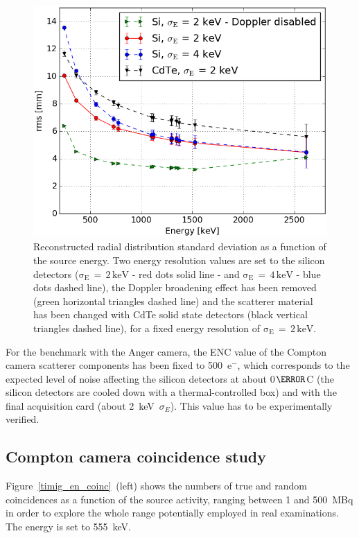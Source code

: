 \begin{figure}[h!]
\centering
\includegraphics[width=.5\linewidth]{03_GraphicFiles/chapter4/SPECT/compton/ENC/rmsVSenergy_ENCstudy_Doppler} 
\caption{Reconstructed radial distribution standard deviation as a function of the source energy. Two energy resolution values are set to the silicon detectors ($\mathrm{\sigma_{E}\,=\,2\,keV}$ - red dots solid line - and $\mathrm{\sigma_{E}\,=\,4\,keV}$ - blue dots dashed line), the Doppler broadening effect has been removed (green horizontal triangles dashed line) and the scatterer material has been changed with CdTe solid state detectors (black vertical triangles dashed line), for a fixed energy resolution of $\mathrm{\sigma_{E}\,=\,2\,keV}$.}
\label{fig:ENC_study}
\end{figure}      
     
For the benchmark with the Anger camera, the ENC value of the Compton camera scatterer components has been fixed to 500~e$^-$, which corresponds to the expected level of noise affecting the silicon detectors at about 0$\degree$C (the silicon detectors are cooled down with a thermal-controlled box) and with the final acquisition card (about 2~keV~$\sigma_{E}$). This value has to be experimentally verified.

\subsection{Compton camera coincidence study}
Figure~\ref{timig_en_coinc}~(left) shows the numbers of true and random coincidences as a function of the source activity, ranging between 1 and 500~MBq in order to explore the whole range potentially employed in real examinations. The energy is set to 555~keV.  

